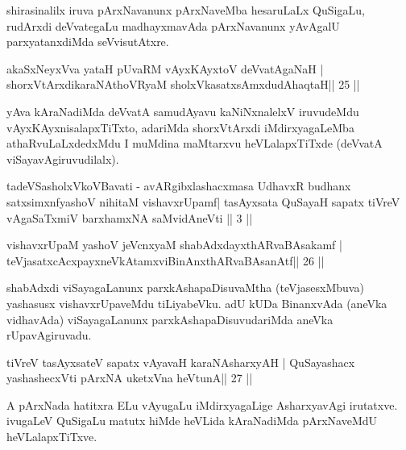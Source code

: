 \begin{artha}
shirasinalilx iruva pArxNavanunx pArxNaveMba hesaruLaLx QuSigaLu, rudArxdi deVvategaLu madhayxmavAda pArxNavanunx yAvAgalU parxyatanxdiMda seVvisutAtxre.
\end{artha}

\begin{shl}
akaSxNeyxVva yataH pUvaRM vAyxKAyxtoV deVvatAgaNaH |
shorxVtArxdikaraNAthoVR\s yaM sholxVkasatxsAmxdudAhaqtaH\hfill || 25 ||
\end{shl}

\begin{artha}
yAva kAraNadiMda deVvatA samudAyavu kaNiNxnalelxV iruvudeMdu vAyxKAyxnisalapxTiTxto, adariMda shorxVtArxdi iMdirxyagaLeMba athaRvuLaLxdedxMdu I muMdina maMtarxvu heVLalapxTiTxde (deVvatA viSayavAgiruvudilalx).
\end{artha}




\begin{kandikeshl}
tadeVSasholxVkoVBavati - avARgibxlashacxmasa UdhavxR budhanx
satxsimxnfyashoV  nihitaM vishavxrUpamf| tasAyx\s\s sata QuSayaH
sapatx tiVreV vAgaSaTxmiV barxhamxNA saMvidAneVti || 3 ||
\end{kandikeshl}

\begin{shl}
vishavxrUpaM yashoV jeVcnxyaM shabAdxdayxthARvaBAsakamf |
teVjasatxcAcxpayxneVkAtamxviBinAnxthARvaBAsanAtf\hfill || 26 ||
\end{shl}

\begin{artha}
shabAdxdi viSayagaLanunx parxkAshapaDisuvaMtha (teVjasesxMbuva) yashasusx vishavxrUpaveMdu tiLiyabeVku. adU kUDa BinanxvAda (aneVka vidhavAda) viSayagaLanunx parxkAshapaDisuvudariMda aneVka rUpavAgiruvadu.
\end{artha}

\begin{shl}
tiVreV tasAyx\s\s sateV sapatx vAyavaH karaNAsharxyAH |
QuSayashacx yashashecxVti pArxNA uketxVna heVtunA\hfill || 27 ||
\end{shl}

\begin{artha}
A pArxNada hatitxra ELu vAyugaLu iMdirxyagaLige AsharxyavAgi irutatxve. ivugaLeV QuSigaLu matutx hiMde heVLida kAraNadiMda pArxNaveMdU heVLalapxTiTxve.
\end{artha}

